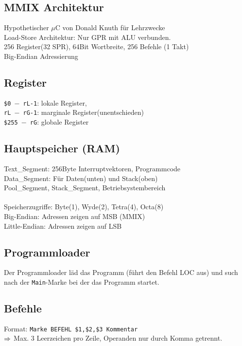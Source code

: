 \documentclass[fs]{latex4ei}
\begin{document}
\begin{multicols}{4}
\section{MMIX Architektur}
Hypothetischer $\mu$C von Donald Knuth für Lehrzwecke\\
Load-Store Architektur: Nur GPR mit ALU verbunden.\\
256 Register(32 SPR), 64Bit Wortbreite, 256 Befehle (1 Takt)\\
Big-Endian Adressierung\\	
	
	\subsection{Register}
	\texttt{\$0 $-$ rL-1}: lokale Register,\\
	\texttt{rL $-$ rG-1}: marginale Register(unentschieden)\\
	\texttt{\$255 $-$ rG}: globale Register\\
		
	\subsection{Hauptspeicher (RAM)}
	Text\_Segment: 256Byte Interruptvektoren, Programmcode\\
	Data\_Segment: Für Daten(unten) und Stack(oben)\\
	Pool\_Segment, Stack\_Segment, Betriebsystembereich\\
	\\
	Speicherzugriffe: Byte(1), Wyde(2), Tetra(4), Octa(8)\\
	Big-Endian: Adressen zeigen auf MSB (MMIX)\\
	Little-Endian: Adressen zeigen auf LSB\\	

	\subsection{Programmloader}
	Der Programmloader läd das Programm (führt den Befehl LOC aus)
	und such nach der \texttt{Main}-Marke bei der das Programm startet.

	
	\subsection{Befehle}
	Format: \texttt{Marke BEFEHL \$1,\$2,\$3 Kommentar}\\
	$\Rightarrow$ Max. 3 Leerzeichen pro Zeile, Operanden nur durch Komma getrennt.
		

\end{multicols}
\end{document}
